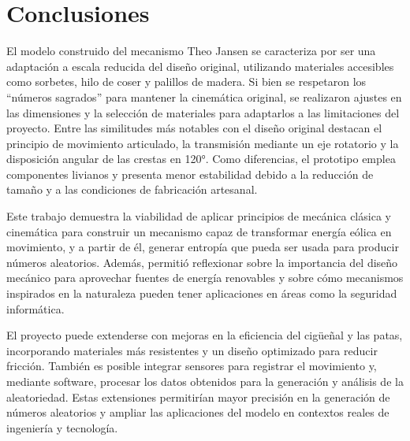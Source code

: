 \section{Conclusiones}
El modelo construido del mecanismo Theo Jansen se caracteriza por ser una adaptación a escala reducida del diseño original, utilizando materiales accesibles como sorbetes, hilo de coser y palillos de madera. Si bien se respetaron los “números sagrados” para mantener la cinemática original, se realizaron ajustes en las dimensiones y la selección de materiales para adaptarlos a las limitaciones del proyecto. Entre las similitudes más notables con el diseño original destacan el principio de movimiento articulado, la transmisión mediante un eje rotatorio y la disposición angular de las crestas en 120°. Como diferencias, el prototipo emplea componentes livianos y presenta menor estabilidad debido a la reducción de tamaño y a las condiciones de fabricación artesanal.

Este trabajo demuestra la viabilidad de aplicar principios de mecánica clásica y cinemática para construir un mecanismo capaz de transformar energía eólica en movimiento, y a partir de él, generar entropía que pueda ser usada para producir números aleatorios. Además, permitió reflexionar sobre la importancia del diseño mecánico para aprovechar fuentes de energía renovables y sobre cómo mecanismos inspirados en la naturaleza pueden tener aplicaciones en áreas como la seguridad informática.

El proyecto puede extenderse con mejoras en la eficiencia del cigüeñal y las patas, incorporando materiales más resistentes y un diseño optimizado para reducir fricción. También es posible integrar sensores para registrar el movimiento y, mediante software, procesar los datos obtenidos para la generación y análisis de la aleatoriedad. Estas extensiones permitirían mayor precisión en la generación de números aleatorios y ampliar las aplicaciones del modelo en contextos reales de ingeniería y tecnología.